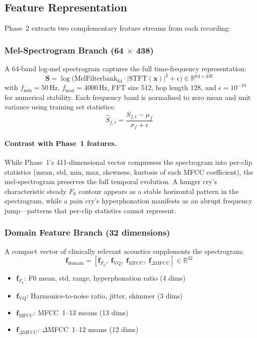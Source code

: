 \documentclass[11pt,a4paper]{article}
\begin{document}
\subsection{Feature Representation}
\label{sec:features}

Phase~2 extracts two complementary feature streams from each recording:

\subsubsection{Mel-Spectrogram Branch (64 $\times$ 438)}

A 64-band log-mel spectrogram captures the full time-frequency
representation:
\begin{equation}
  \mathbf{S} = \log\bigl(\text{MelFilterbank}_{64} \cdot
  |\text{STFT}(\mathbf{x})|^2 + \epsilon\bigr)
  \in \mathbb{R}^{64 \times 438}
  \label{eq:melspec}
\end{equation}
with $f_{\min} = 50$\,Hz, $f_{\max} = 4000$\,Hz, FFT size 512,
hop length 128, and $\epsilon = 10^{-10}$ for numerical stability.
Each frequency band is normalised to zero mean and unit variance
using training set statistics:
\begin{equation}
  \hat{S}_{f,t} = \frac{S_{f,t} - \mu_f}{\sigma_f + \epsilon}
\end{equation}

\paragraph{Contrast with Phase~1 features.}
While Phase~1's 411-dimensional vector compresses the spectrogram into
per-clip statistics (mean, std, min, max, skewness, kurtosis of each
MFCC coefficient), the mel-spectrogram preserves the full temporal
evolution. A hunger cry's characteristic steady $F_0$ contour appears
as a stable horizontal pattern in the spectrogram, while a pain cry's
hyperphonation manifests as an abrupt frequency jump---patterns that
per-clip statistics cannot represent.

\subsubsection{Domain Feature Branch (32 dimensions)}

A compact vector of clinically relevant acoustics supplements the
spectrogram:
\begin{equation}
  \mathbf{f}_{\text{domain}} = [\mathbf{f}_{F_0},\;
  \mathbf{f}_{\text{VQ}},\; \mathbf{f}_{\text{MFCC}},\;
  \mathbf{f}_{\Delta\text{MFCC}}] \in \mathbb{R}^{32}
  \label{eq:domain}
\end{equation}
\begin{itemize}[nosep]
  \item $\mathbf{f}_{F_0}$: F0 mean, std, range, hyperphonation ratio
        (4 dims)
  \item $\mathbf{f}_{\text{VQ}}$: Harmonics-to-noise ratio, jitter,
        shimmer (3 dims)
  \item $\mathbf{f}_{\text{MFCC}}$: MFCC~1--13 means (13 dims)
  \item $\mathbf{f}_{\Delta\text{MFCC}}$: $\Delta$MFCC~1--12 means
        (12 dims)
\end{itemize}
\end{document}
